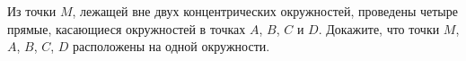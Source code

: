 \begin{ex}
	\begin{condition}
		Из точки \( M  \), лежащей вне двух концентрических	окружностей, проведены четыре прямые, касающиеся окружностей в точках \( A \), \( B \), \( C  \) и \( D \). Докажите, что точки \( M  \), \( A \), \( B \), \( C \), \( D  \) расположены на одной окружности.
	\end{condition}
\end{ex}